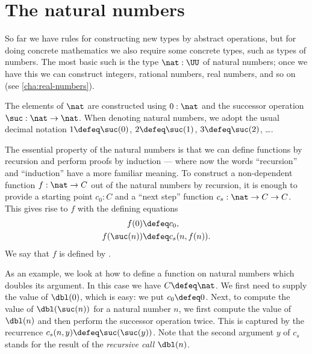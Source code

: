 %


\section{The natural numbers}
\label{sec:inductive-types}

%
%
%
So far we have rules for constructing new types by abstract operations, but for doing concrete mathematics we also require some concrete types, such as types of numbers.
The most basic such is the type $\nat : \UU$ of natural numbers; once we have this we can construct integers, rational numbers, real numbers, and so on (see \cref{cha:real-numbers}).

The elements of $\nat$ are constructed using $0 : \nat$ and the successor operation $\suc : \nat \to \nat$.
When denoting natural numbers, we adopt the usual decimal notation $1 \defeq \suc(0)$, $2 \defeq \suc(1)$, $3 \defeq \suc(2)$, \dots.

The essential property of the natural numbers is that we can define functions by recursion and perform proofs by induction --- where now the words ``recursion'' and ``induction'' have a more familiar meaning.
%
To construct a non-dependent function $f : \nat \to C$ out of the natural numbers by recursion, it is enough to provide a starting point $c_0 : C$ and a ``next step'' function $c_s : \nat \to C \to C$.
This gives rise to $f$ with the defining equations
\begin{align*}
  f(0) &\defeq c_0, \\
  f(\suc(n)) &\defeq c_s(n,f(n)).
\end{align*}
We say that $f$ is defined by .
%
%

As an example, we look at how to define a function on natural numbers which doubles its argument.
In this case we have $C\defeq \nat$.
We first need to supply the value of $\dbl(0)$, which is easy: we put $c_0 \defeq 0$.
Next, to compute the value of $\dbl(\suc(n))$ for a natural number $n$, we first compute the value of $\dbl(n)$ and then perform the successor operation twice.
This is captured by the recurrence $c_s(n,y) \defeq \suc(\suc(y))$.
Note that the second argument $y$ of $c_s$ stands for the result of the \emph{recursive call} $\dbl(n)$.

